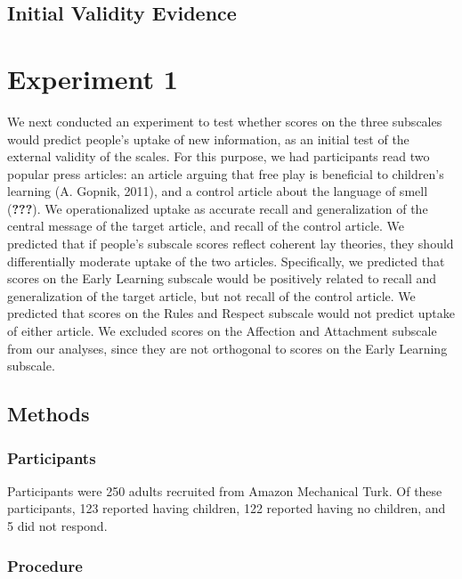 \documentclass[10pt, letterpaper]{article}
\begin{document}
\subsection{Initial Validity Evidence}\label{initial-validity-evidence}

\section{Experiment 1}\label{experiment-1}

We next conducted an experiment to test whether scores on the three
subscales would predict people's uptake of new information, as an
initial test of the external validity of the scales. For this purpose,
we had participants read two popular press articles: an article arguing
that free play is beneficial to children's learning (A. Gopnik, 2011),
and a control article about the language of smell ({\textbf{???}}). We
operationalized uptake as accurate recall and generalization of the
central message of the target article, and recall of the control
article. We predicted that if people's subscale scores reflect coherent
lay theories, they should differentially moderate uptake of the two
articles. Specifically, we predicted that scores on the Early Learning
subscale would be positively related to recall and generalization of the
target article, but not recall of the control article. We predicted that
scores on the Rules and Respect subscale would not predict uptake of
either article. We excluded scores on the Affection and Attachment
subscale from our analyses, since they are not orthogonal to scores on
the Early Learning subscale.

\subsection{Methods}\label{methods}

\subsubsection{Participants}\label{participants}

Participants were 250 adults recruited from Amazon Mechanical Turk. Of
these participants, 123 reported having children, 122 reported having no
children, and 5 did not respond.

\subsubsection{Procedure}\label{procedure}
\end{document}
